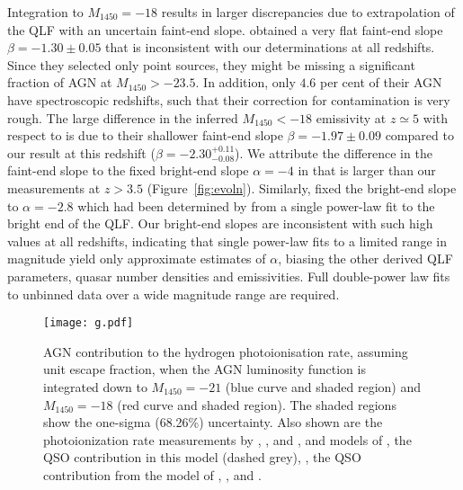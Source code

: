 \documentclass[fleqn,usenatbib]{mnras}
\begin{document}
Integration to $M_{1450}=-18$ results in larger discrepancies due to extrapolation of the QLF
with an uncertain faint-end slope. 
\citet{2018PASJ...70S..34A} obtained a very flat faint-end slope $\beta=-1.30\pm 0.05$
that is inconsistent with our determinations at all redshifts. Since they selected only
point sources, they might be missing a significant fraction of AGN at $M_{1450}>-23.5$.
In addition, only $4.6$ per cent of their AGN have spectroscopic redshifts,
such that their correction for contamination is very rough.
The large difference in the inferred $M_{1450}<-18$ emissivity at $z\simeq 5$ with respect to
\citet{2018AJ....155..131M} is due to their shallower faint-end slope $\beta=-1.97\pm 0.09$
compared to our result at this redshift ($\beta=-2.30^{+0.11}_{-0.08}$). We attribute the difference
in the faint-end slope to the fixed bright-end slope $\alpha=-4$ in \citet{2018AJ....155..131M}
that is larger than our measurements at $z>3.5$ (Figure~\ref{fig:evoln}). 
Similarly, \citet{2017ApJ...847L..15O} fixed the bright-end slope to $\alpha=-2.8$ which had been
determined by \citet{2016ApJ...833..222J} from a single power-law fit to the bright end of the QLF.
Our bright-end slopes are inconsistent with such high values at all redshifts, indicating that single
power-law fits to a limited range in magnitude yield only approximate estimates of $\alpha$,
biasing the other derived QLF parameters, quasar number densities and emissivities.
Full double-power law fits to unbinned data over a wide magnitude range are required.




\begin{figure*}
  \begin{center}
    \texttt{[image: g.pdf]}
  \end{center}
  \caption{AGN contribution to the hydrogen photoionisation rate,
    assuming unit escape fraction, when the AGN luminosity function is
    integrated down to $M_{1450}=-21$ (blue curve and shaded region)
    and $M_{1450}=-18$ (red curve and shaded region).  The shaded
    regions show the one-sigma (68.26\%) uncertainty.  Also shown are
    the photoionization rate measurements by \citet[filled
      circles]{2013MNRAS.436.1023B}, \citet[inverted
      triangles]{2011MNRAS.412.2543C}, and
    \citet[pentagons]{2017MNRAS.467.3172G}, and models of
    \citet[dotted brown curve]{2012ApJ...746..125H}, the QSO
    contribution in this model (dashed grey), \citet[dashed
      brown]{2015ApJ...813L...8M}, the QSO contribution from the model
    of \citet[dashed orange]{2015MNRAS.451L..30K}, \citet[dotted
      grey]{2017ApJ...837..106O}, and \citet[dashed
      grey]{2018arXiv180104931P}.}
  \label{fig:gammapi}
\end{figure*}
\end{document}
